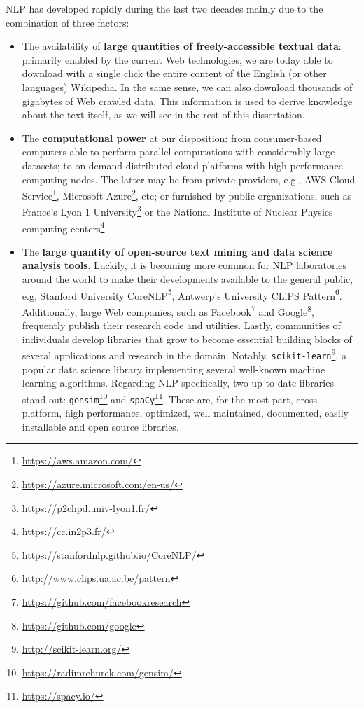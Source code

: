 NLP has developed rapidly during the last two decades mainly due to the combination of three factors: 
\begin{itemize}
\item The  availability of \textbf{large quantities of freely-accessible textual data}: primarily enabled by the current Web technologies, we are today able to download with a single click the entire content of the English (or other languages) Wikipedia. In the same sense, we can also download thousands of gigabytes of Web crawled data. This information is used to derive knowledge about the text itself, as we will see in the rest of this dissertation. 
\item The \textbf{computational power} at our disposition: from consumer-based computers able to perform parallel computations with considerably large datasets; to on-demand distributed cloud platforms with high performance computing nodes. The latter may be from private providers, e.g., AWS Cloud Service\footnote{\url{https://aws.amazon.com/}}, Microsoft Azure\footnote{\url{https://azure.microsoft.com/en-us/}}, etc; or furnished by public organizations, such as France's Lyon 1 University\footnote{\url{https://p2chpd.univ-lyon1.fr/}} or the National Institute of Nuclear Physics computing centers\footnote{\url{https://cc.in2p3.fr/}}.

\item  The \textbf{large quantity of open-source text mining and data science analysis tools}. Luckily, it is becoming more common for NLP laboratories around the world to make their developments available to the general public, e.g, Stanford University CoreNLP\footnote{\url{https://stanfordnlp.github.io/CoreNLP/}}, Antwerp's University CLiPS Pattern\footnote{\url{http://www.clips.ua.ac.be/pattern}}.
Additionally, large Web companies, such as Facebook\footnote{\url{https://github.com/facebookresearch}} and Google\footnote{\url{https://github.com/google}}, frequently publish their research code and utilities. Lastly, communities of individuals develop libraries that grow to become essential building blocks of several applications and research in the domain. Notably, \texttt{scikit-learn}\footnote{\url{http://scikit-learn.org/}}, a popular data science library implementing several well-known machine learning algorithms. Regarding NLP specifically, two up-to-date libraries stand out:  \texttt{gensim}\footnote{\url{https://radimrehurek.com/gensim/}} and \texttt{spaCy}\footnote{\url{https://spacy.io/}}. These are, for the most part, cross-platform, high performance, optimized, well maintained, documented, easily installable and open source libraries.

\end{itemize} 
